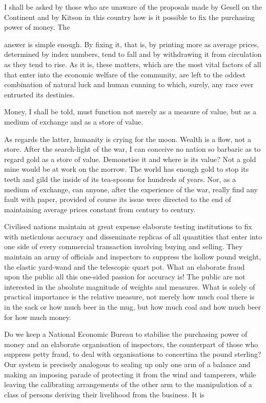 \documentclass[10.5pt,twoside]{book}
\newcommand{\origpage}[1]{\clearpage\setcounter{page}{#1}}
\begin{document}
I shall be asked by those who are unaware of the proposals made by Gesell on
the Continent and by Kitson in this country how is it possible to fix the
purchasing power of money. The

\origpage{18}

\noindent answer is simple enough. By fixing it, that is, by printing more as
average prices, determined by index numbers, tend to fall and by withdrawing
it from circulation as they tend to rise. As it is, these matters, which are
the most vital factors of all that enter into the economic welfare of the
community, are left to the oddest combination of natural luck and human
cunning to which, surely, any race ever entrusted its destinies.

Money, I shall be told, must function not merely as a measure of value, but as
a medium of exchange and as a store of value.

As regards the latter, humanity is crying for the moon. Wealth is a flow, not
a store. After the search-light of the war, I can conceive no nation so
barbaric as to regard gold as a store of value. Demonetise it and where is its
value? Not a gold mine would be at work on the morrow. The world has enough
gold to stop its teeth and gild the inside of its tea-spoons for hundreds of
years. Nor, as a medium of exchange, can anyone, after the experience of the
war, really find any fault with paper, provided of course its issue were
directed to the end of maintaining average prices constant from century to
century.

Civilised nations maintain at great expense elaborate testing institutions to
fix with meticulous accuracy and disseminate replicas of all quantities that
enter into one side of every commercial transaction involving buying and
selling. They maintain an army of officials and inspectors to suppress the
hollow pound weight, the elastic yard-wand and the telescopic quart pot. What
an elaborate fraud upon the public all this one-sided passion for accuracy is!
The public are not interested in the absolute magnitude of weights and
measures. What is solely of practical importance is the relative measure, not
merely how much coal there is in the sack or how much beer in the mug, but how
much coal and how much beer for how much money.

Do we keep a National Economic Bureau to stabilise the purchasing power of
money and an elaborate organisation of inspectors, the counterpart of those
who suppress petty fraud, to deal with organisations to concertina the pound
sterling? Our system is precisely analogous to sealing up only one arm of a
balance and making an imposing parade of protecting it from the wind and
tamperers, while leaving the calibrating arrangements of the other arm to the
manipulation of a class of persons deriving their livelihood from the
business. It is
\end{document}
